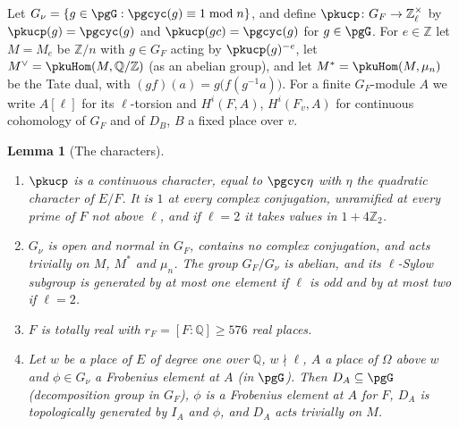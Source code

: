 \documentclass[10pt]{amsart}
\newtheorem{lemma}[theorem]{Lemma}
\theoremstyle{definition}
\theoremstyle{remark}
\newcommand{\Z}{\mathbb Z}
\newcommand{\Q}{\mathbb Q}
\begin{document}
Let $G_\nu=\{g\in\pgG:\pgcyc(g)\equiv1\bmod n\}$, and define $\pkucp\colon G_F\to\Z_\ell^\times$ by
$\pkucp(g)=\pgcyc(g)$ and $\pkucp(gc)=\pgcyc(g)$ for $g\in\pgG$. For $e\in\Z$ let $M=M_e$ be $\Z/n$
with $g\in G_F$ acting by $\pkucp(g)^{-e}$, let $M^\vee=\pkuHom(M,\Q/\Z)$ (as an abelian group), and
let $M^*=\pkuHom(M,\mu_n)$ be the Tate dual, with $(gf)(a)=g\bigl(f(g^{-1}a)\bigr)$. For a finite
$G_F$-module $A$ we write $A[\ell]$ for its $\ell$-torsion and $H^i(F,A)$, $H^i(F_v,A)$ for
continuous cohomology of $G_F$ and of $D_{B}$, $B$ a fixed place over $v$.

\begin{lemma}[The characters]\label{pku:basic}
\begin{enumerate}
\item[(i)] $\pkucp$ is a continuous character, equal to $\pgcyc\eta$ with $\eta$ the quadratic
character of $E/F$. It is $1$ at every complex conjugation, unramified at every prime of $F$ not
above $\ell$, and if $\ell=2$ it takes values in $1+4\Z_2$.
\item[(ii)] $G_\nu$ is open and normal in $G_F$, contains no complex conjugation, and acts trivially
on $M$, $M^*$ and $\mu_n$. The group $G_F/G_\nu$ is abelian, and its $\ell$-Sylow subgroup is
generated by at most one element if $\ell$ is odd and by at most two if $\ell=2$.
\item[(iii)] $F$ is totally real with $r_F=[F:\Q]\ge576$ real places.
\item[(iv)] Let $w$ be a place of $E$ of degree one over $\Q$, $w\nmid\ell$, $A$ a place of
$\Omega$ above $w$ and $\phi\in G_\nu$ a Frobenius element at $A$ (in $\pgG$). Then $D_A\subseteq
\pgG$ (decomposition group in $G_F$), $\phi$ is a Frobenius element at $A$ for $F$, $D_A$ is
topologically generated by $I_A$ and $\phi$, and $D_A$ acts trivially on $M$.
\end{enumerate}
\end{lemma}
\end{document}
